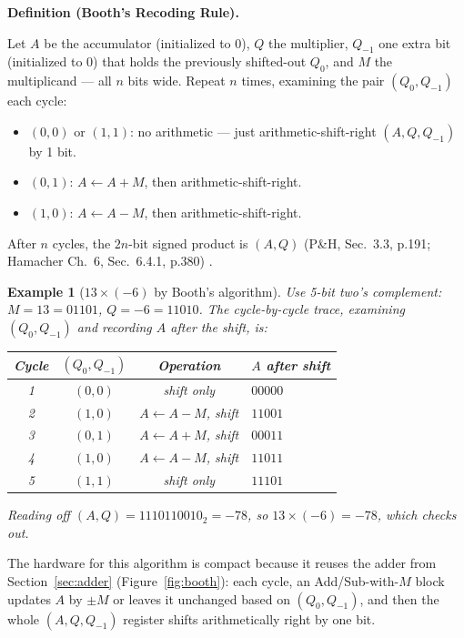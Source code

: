 \documentclass[11pt]{article}
\newtheorem{example}{Example}[section]
\newenvironment{definitionbox}[1]{%
  \par\noindent\textbf{Definition (#1).}\ \itshape
}{\par\vspace{0.3em}}
\begin{document}
\begin{definitionbox}{Booth's Recoding Rule}
Let $A$ be the accumulator (initialized to 0), $Q$ the multiplier, $Q_{-1}$ one extra bit (initialized to 0) that holds the previously shifted-out $Q_0$, and $M$ the multiplicand --- all $n$ bits wide. Repeat $n$ times, examining the pair $(Q_0, Q_{-1})$ each cycle:
\begin{itemize}
  \item $(0,0)$ or $(1,1)$: no arithmetic --- just arithmetic-shift-right $(A,Q,Q_{-1})$ by 1 bit.
  \item $(0,1)$: $A \gets A + M$, then arithmetic-shift-right.
  \item $(1,0)$: $A \gets A - M$, then arithmetic-shift-right.
\end{itemize}
After $n$ cycles, the $2n$-bit signed product is $(A,Q)$ (P\&H, Sec.~3.3, p.191; Hamacher Ch.~6, Sec.~6.4.1, p.380) \cite{PattersonHennessy2017_computer_organization_design,Hamacher2002_computer_organization}.
\end{definitionbox}

\begin{example}[$13 \times (-6)$ by Booth's algorithm]
Use 5-bit two's complement: $M=13=01101$, $Q=-6=11010$. The cycle-by-cycle trace, examining $(Q_0,Q_{-1})$ and recording $A$ after the shift, is:
\begin{center}
\small
\begin{tabular}{@{}cccl@{}}
\toprule
Cycle & $(Q_0,Q_{-1})$ & Operation & $A$ after shift \\
\midrule
1 & $(0,0)$ & shift only & $00000$ \\
2 & $(1,0)$ & $A\gets A-M$, shift & $11001$ \\
3 & $(0,1)$ & $A\gets A+M$, shift & $00011$ \\
4 & $(1,0)$ & $A\gets A-M$, shift & $11011$ \\
5 & $(1,1)$ & shift only & $11101$ \\
\bottomrule
\end{tabular}
\end{center}
Reading off $(A,Q) = 1110110010_2 = -78$, so $13 \times (-6) = -78$, which checks out.
\end{example}

The hardware for this algorithm is compact because it reuses the adder from Section~\ref{sec:adder} (Figure~\ref{fig:booth}): each cycle, an Add/Sub-with-$M$ block updates $A$ by $\pm M$ or leaves it unchanged based on $(Q_0,Q_{-1})$, and then the whole $(A,Q,Q_{-1})$ register shifts arithmetically right by one bit.
\end{document}
